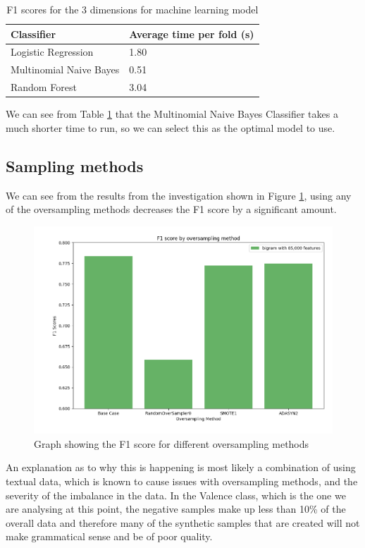 \begin{table}
\centering
\caption{F1 scores for the 3 dimensions for machine learning model}
\begin{tabular}{ |p{3cm}|p{3cm}|}
 \hline
  Classifier & Average time per fold (s)\\
 \hline
  Logistic Regression & 1.80\\
  Multinomial Naive Bayes & 0.51 \\
  Random Forest & 3.04\\
 \hline
\end{tabular}
\label{model:times}
\end{table}

We can see from Table \ref{model:times} that the Multinomial Naive Bayes Classifier takes a much shorter time to run, so we can select this as the optimal model to use.

\subsection{Sampling methods}

We can see from the results from the investigation shown in  Figure \ref{oversamplegraph}, using any of the oversampling methods decreases the F1 score by a significant amount. 

\begin{figure}[ht]
\centering
\includegraphics[scale=0.5]{graphs/OversampleNB.png}
\caption{Graph showing the F1 score for different oversampling methods}
\label{oversamplegraph}
\end{figure}

An explanation as to why this is happening is most likely a combination of using textual data, which is known to cause issues with oversampling methods, and the severity of the imbalance in the data. In the Valence class, which is the one we are analysing at this point, the negative samples make up less than 10\% of the overall data and therefore many of the synthetic samples that are created will not make grammatical sense and be of poor quality. 

